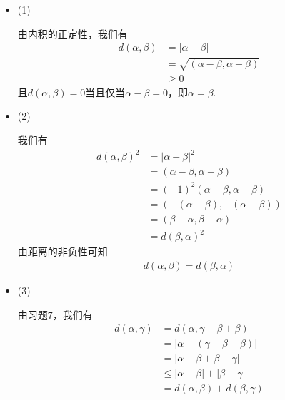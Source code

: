 \documentclass{article}
\begin{document}
\begin{itemize}
  \item (1)

        由内积的正定性，我们有
        \begin{align*}
          d(\alpha, \beta)
           & = |\alpha - \beta|                        \\
           & = \sqrt{(\alpha - \beta, \alpha - \beta)} \\
           & \geq 0
        \end{align*}
        且$d(\alpha, \beta) = 0$当且仅当$\alpha - \beta = 0$，即$\alpha = \beta$.

  \item (2)

        我们有
        \begin{align*}
          d(\alpha, \beta)^2
           & = |\alpha - \beta|^2                      \\
           & = (\alpha - \beta, \alpha - \beta)        \\
           & = (-1)^2 (\alpha - \beta, \alpha - \beta) \\
           & = (-(\alpha - \beta), - (\alpha - \beta)) \\
           & = (\beta - \alpha, \beta - \alpha)        \\
           & = d(\beta, \alpha)^2
        \end{align*}
        由距离的非负性可知
        \begin{align*}
          d(\alpha, \beta) = d(\beta, \alpha)
        \end{align*}

  \item (3)

        由习题7，我们有
        \begin{align*}
          d(\alpha, \gamma)
           & = d(\alpha, \gamma - \beta + \beta)      \\
           & = |\alpha - (\gamma - \beta + \beta)|    \\
           & = |\alpha - \beta + \beta - \gamma|      \\
           & \leq |\alpha - \beta| + |\beta - \gamma| \\
           & = d(\alpha, \beta) + d(\beta, \gamma)
        \end{align*}
\end{itemize}
\end{document}

